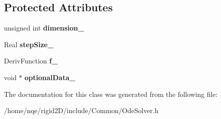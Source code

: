 \subsection*{Protected Attributes}
\begin{DoxyCompactItemize}
\item 
\hypertarget{class_rigid2_d_1_1_ode_solver_a1be4eb3c7b6ef72d949a966682769a33}{
unsigned int {\bfseries dimension\_\-}}
\label{class_rigid2_d_1_1_ode_solver_a1be4eb3c7b6ef72d949a966682769a33}

\item 
\hypertarget{class_rigid2_d_1_1_ode_solver_aec56edf2d94e81d00d42cd3dcc2a6812}{
Real {\bfseries stepSize\_\-}}
\label{class_rigid2_d_1_1_ode_solver_aec56edf2d94e81d00d42cd3dcc2a6812}

\item 
\hypertarget{class_rigid2_d_1_1_ode_solver_a1a7dbd8494db7278e83e91675d721c2f}{
DerivFunction {\bfseries f\_\-}}
\label{class_rigid2_d_1_1_ode_solver_a1a7dbd8494db7278e83e91675d721c2f}

\item 
\hypertarget{class_rigid2_d_1_1_ode_solver_af444f0609f63f97d508de0856e5632c2}{
void $\ast$ {\bfseries optionalData\_\-}}
\label{class_rigid2_d_1_1_ode_solver_af444f0609f63f97d508de0856e5632c2}

\end{DoxyCompactItemize}


The documentation for this class was generated from the following file:\begin{DoxyCompactItemize}
\item 
/home/nqe/rigid2D/include/Common/OdeSolver.h\end{DoxyCompactItemize}
